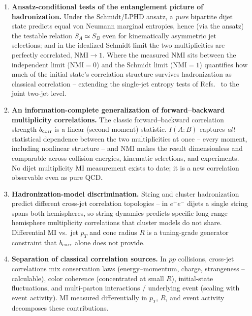 \documentclass[11pt]{article}
\newcommand{\NMI}{\mathrm{NMI}}
\begin{document}
\begin{enumerate}

\item \textbf{Ansatz-conditional tests of the entanglement picture of
hadronization.} Under the Schmidt/LPHD ansatz, a \emph{pure} bipartite
dijet state predicts equal von Neumann marginal entropies, hence
(via the ansatz) the testable relation $S_A \simeq S_B$ even for
kinematically asymmetric jet selections; and in the idealized Schmidt
limit the two multiplicities are perfectly correlated, $\NMI\to1$. Where
the measured $\NMI$ sits between the independent limit ($\NMI=0$) and the
Schmidt limit ($\NMI=1$) quantifies how much of the initial state's
correlation structure survives hadronization as classical correlation --
extending the single-jet entropy tests of
Refs.~\cite{TKU2020,H1_2021,Datta2025} to the joint two-jet level.

\item \textbf{An information-complete generalization of
forward--backward multiplicity correlations.} The classic
forward--backward correlation strength $b_{\rm corr}$
\cite{ALICE2015fb} is a linear (second-moment) statistic. $I(A{:}B)$
captures \emph{all} statistical dependence between the two multiplicities
at once -- every moment, including nonlinear structure -- and $\NMI$
makes the result dimensionless and comparable across collision energies,
kinematic selections, and experiments. No dijet multiplicity MI
measurement exists to date; it is a new correlation observable even as
pure QCD.

\item \textbf{Hadronization-model discrimination.} String and cluster
hadronization predict different cross-jet correlation topologies -- in
$e^+e^-$ dijets a single string spans both hemispheres, so string
dynamics predicts specific long-range hemisphere multiplicity
correlations that cluster models do not share. Differential MI vs.\ jet
$p_T$ and cone radius $R$ is a tuning-grade generator constraint that
$b_{\rm corr}$ alone does not provide.

\item \textbf{Separation of classical correlation sources.} In $pp$
collisions, cross-jet correlations mix conservation laws
(energy--momentum, charge, strangeness -- calculable), color coherence
(concentrated at small $R$), initial-state fluctuations, and
multi-parton interactions / underlying event (scaling with event
activity). MI measured differentially in $p_T$, $R$, and event activity
decomposes these contributions.


\end{enumerate}
\end{document}
